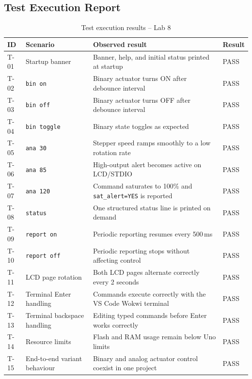 \documentclass[12pt]{article}
\begin{document}
\subsection{Test Execution Report}
\begin{table}[H]
\centering
\small
\begin{tabular}{p{0.8cm} p{3.3cm} p{6.0cm} p{1.3cm}}
\toprule
\textbf{ID} & \textbf{Scenario} & \textbf{Observed result} & \textbf{Result} \\
\midrule
T-01 & Startup banner & Banner, help, and initial status printed at startup & PASS \\
T-02 & \texttt{bin on} & Binary actuator turns ON after debounce interval & PASS \\
T-03 & \texttt{bin off} & Binary actuator turns OFF after debounce interval & PASS \\
T-04 & \texttt{bin toggle} & Binary state toggles as expected & PASS \\
T-05 & \texttt{ana 30} & Stepper speed ramps smoothly to a low rotation rate & PASS \\
T-06 & \texttt{ana 85} & High-output alert becomes active on LCD/STDIO & PASS \\
T-07 & \texttt{ana 120} & Command saturates to 100\% and \texttt{sat\_alert=YES} is reported & PASS \\
T-08 & \texttt{status} & One structured status line is printed on demand & PASS \\
T-09 & \texttt{report on} & Periodic reporting resumes every 500\,ms & PASS \\
T-10 & \texttt{report off} & Periodic reporting stops without affecting control & PASS \\
T-11 & LCD page rotation & Both LCD pages alternate correctly every 2 seconds & PASS \\
T-12 & Terminal Enter handling & Commands execute correctly with the VS Code Wokwi terminal & PASS \\
T-13 & Terminal backspace handling & Editing typed commands before Enter works correctly & PASS \\
T-14 & Resource limits & Flash and RAM usage remain below Uno limits & PASS \\
T-15 & End-to-end variant behaviour & Binary and analog actuator control coexist in one project & PASS \\
\bottomrule
\end{tabular}
\caption{Test execution results -- Lab 8}
\label{tab:testresults}
\end{table}
\end{document}

